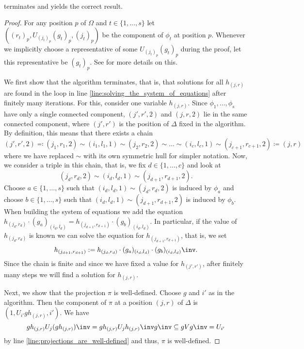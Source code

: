 \begin{prop}
 terminates and yields the correct result.
\end{prop}
\begin{proof}
For any position $p$ of $\Omega$ and $t \in \{1,\dots,s\}$ let $((r_t)_p,U_{(j_t)_p}(g_t)_p,(j_t)_p)$ be the component of $\phi_t$ at position $p$. Whenever we implicitly choose a representative of some $U_{(j_t)_p}(g_t)_p$ during the proof, let this representative be $(g_t)_p$. See  for more details on this.

We first show that the algorithm terminates, that is, that solutions for all $h_{(j,r)}$ are found in the loop in line \ref{line:solving_the_system_of_equations} after finitely many iterations. For this, consider one variable $h_{(j,r)}$. Since $\phi_1,\dots,\phi_s$ have only a single connected component, $(j',r',2)$ and $(j,r,2)$ lie in the same connected component, where $(j',r')$ is the position of $\Delta$ fixed in the algorithm. By definition, this means that there exists a chain
\begin{equation}
(j',r',2) \eqqcolon (j_1,r_1,2) \sim (i_1,l_1,1) \sim (j_2,r_2,2) \sim \dots \sim (i_c,l_c,1) \sim (j_{c+1},r_{c+1},2) \coloneqq (j,r)\label{eq:chain}
\end{equation}
where we have replaced $\sim$ with its own symmetric hull for simpler notation. Now, we consider a triple in this chain, that is, we fix $d \in \{1,\dots,c\}$ and look at \[(j_d,r_d,2) \sim (i_d,l_d,1) \sim (j_{d+1},r_{d+1},2).\] Choose $a \in \{1,\dots,s\}$ such that $(i_d,l_d,1) \sim (j_d,r_d,2)$ is induced by $\phi_a$ and choose $b \in \{1,\dots,s\}$ such that $(i_d,l_d,1) \sim (j_{d+1},r_{d+1},2)$ is induced by $\phi_b$. When building the system of equations we add the equation $h_{(j_d,r_d)} \cdot (g_a)_{(i_d,l_d)} = h_{(j_{d+1},r_{d+1})} \cdot (g_b)_{(i_d,l_d)}$. In particular, if the value of $h_{(j_d,r_d)}$ is known we can solve the equation for $h_{(j_{d+1},r_{d+1})}$, that is, we set
\begin{equation}
h_{(j_{d+1},r_{d+1})}:= h_{(j_d,r_d)} \cdot (g_a)_{(i_d,l_d)} \cdot (g_b)_{(i_d,l_d)}\inv.\label{eq:solving_chain_triple}
\end{equation}
Since the chain is finite and since we have fixed a value for $h_{(j',r')}$, after finitely many steps we will find a solution for $h_{(j,r)}$.

Next, we show that the projection $\pi$ is well-defined. Choose $g$ and $i'$ as in the algorithm. Then the component of $\pi$ at a position $(j,r)$ of $\Delta$ is $(1,U_{i'}gh_{(j,r)},i')$. We have \[gh_{(j,r)}U_j(gh_{(j,r)})\inv = gh_{(j,r)}U_jh_{(j,r)}\inv g\inv \subseteq gVg\inv = U_{i'}\] by line \ref{line:projections_are_well-defined} and thus, $\pi$ is well-defined.


\end{proof}
